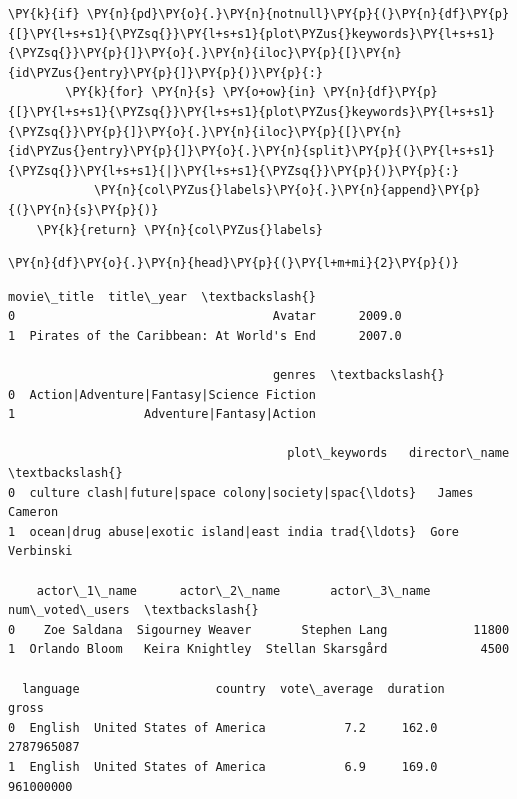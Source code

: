 \begin{tcolorbox}[breakable, size=fbox, boxrule=1pt, pad at break*=1mm,colback=cellbackground, colframe=cellborder]
\begin{Verbatim}[commandchars=\\\{\}]
    \PY{k}{if} \PY{n}{pd}\PY{o}{.}\PY{n}{notnull}\PY{p}{(}\PY{n}{df}\PY{p}{[}\PY{l+s+s1}{\PYZsq{}}\PY{l+s+s1}{plot\PYZus{}keywords}\PY{l+s+s1}{\PYZsq{}}\PY{p}{]}\PY{o}{.}\PY{n}{iloc}\PY{p}{[}\PY{n}{id\PYZus{}entry}\PY{p}{]}\PY{p}{)}\PY{p}{:}
        \PY{k}{for} \PY{n}{s} \PY{o+ow}{in} \PY{n}{df}\PY{p}{[}\PY{l+s+s1}{\PYZsq{}}\PY{l+s+s1}{plot\PYZus{}keywords}\PY{l+s+s1}{\PYZsq{}}\PY{p}{]}\PY{o}{.}\PY{n}{iloc}\PY{p}{[}\PY{n}{id\PYZus{}entry}\PY{p}{]}\PY{o}{.}\PY{n}{split}\PY{p}{(}\PY{l+s+s1}{\PYZsq{}}\PY{l+s+s1}{|}\PY{l+s+s1}{\PYZsq{}}\PY{p}{)}\PY{p}{:}
            \PY{n}{col\PYZus{}labels}\PY{o}{.}\PY{n}{append}\PY{p}{(}\PY{n}{s}\PY{p}{)}
    \PY{k}{return} \PY{n}{col\PYZus{}labels}
\end{Verbatim}
\end{tcolorbox}

    \begin{tcolorbox}[breakable, size=fbox, boxrule=1pt, pad at break*=1mm,colback=cellbackground, colframe=cellborder]
\begin{Verbatim}[commandchars=\\\{\}]
\PY{n}{df}\PY{o}{.}\PY{n}{head}\PY{p}{(}\PY{l+m+mi}{2}\PY{p}{)}
\end{Verbatim}
\end{tcolorbox}

            \begin{tcolorbox}[breakable, boxrule=.5pt, size=fbox, pad at break*=1mm, opacityfill=0]
\begin{Verbatim}[commandchars=\\\{\}]
                                movie\_title  title\_year  \textbackslash{}
0                                    Avatar      2009.0
1  Pirates of the Caribbean: At World's End      2007.0

                                     genres  \textbackslash{}
0  Action|Adventure|Fantasy|Science Fiction
1                  Adventure|Fantasy|Action

                                       plot\_keywords   director\_name  \textbackslash{}
0  culture clash|future|space colony|society|spac{\ldots}   James Cameron
1  ocean|drug abuse|exotic island|east india trad{\ldots}  Gore Verbinski

    actor\_1\_name      actor\_2\_name       actor\_3\_name  num\_voted\_users  \textbackslash{}
0    Zoe Saldana  Sigourney Weaver       Stephen Lang            11800
1  Orlando Bloom   Keira Knightley  Stellan Skarsgård             4500

  language                   country  vote\_average  duration       gross
0  English  United States of America           7.2     162.0  2787965087
1  English  United States of America           6.9     169.0   961000000
\end{Verbatim}
\end{tcolorbox}
        
